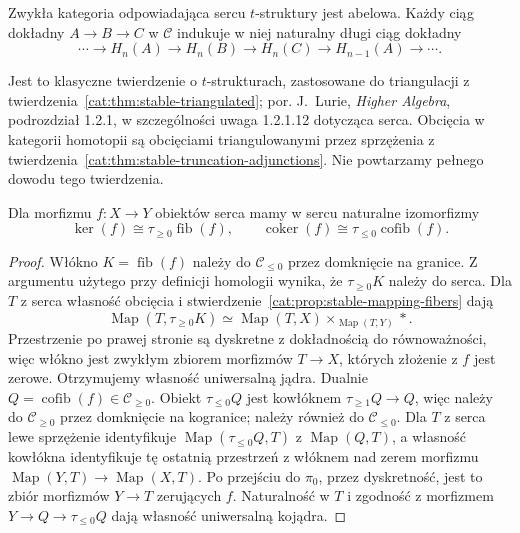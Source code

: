 \begin{twierdzenie}\label{cat:thm:stable-heart-abelian}
Zwykła kategoria odpowiadająca sercu $t$-struktury jest abelowa. Każdy ciąg dokładny $A\to B\to C$ w $\mathcal C$ indukuje w niej naturalny długi ciąg dokładny
\[
 \cdots\longrightarrow H_n(A)\longrightarrow H_n(B)
 \longrightarrow H_n(C)\longrightarrow H_{n-1}(A)
 \longrightarrow\cdots.
\]
\end{twierdzenie}
Jest to klasyczne twierdzenie o $t$-strukturach, zastosowane do triangulacji z twierdzenia~\ref{cat:thm:stable-triangulated}; por. J.~Lurie, \emph{Higher Algebra}, podrozdział 1.2.1, w szczególności uwaga 1.2.1.12 dotycząca serca. Obcięcia w kategorii homotopii są obcięciami triangulowanymi przez sprzężenia z twierdzenia~\ref{cat:thm:stable-truncation-adjunctions}. Nie powtarzamy pełnego dowodu tego twierdzenia.

\begin{stwierdzenie}\label{cat:prop:stable-heart-kernel-cokernel}
Dla morfizmu $f:X\to Y$ obiektów serca mamy w sercu naturalne izomorfizmy
\[
 \ker(f)\cong\tau_{\geq0}\operatorname{fib}(f),\qquad
 \operatorname{coker}(f)\cong\tau_{\leq0}\operatorname{cofib}(f).
\]
\end{stwierdzenie}
\begin{proof}
Włókno $K=\operatorname{fib}(f)$ należy do $\mathcal C_{\leq0}$ przez domknięcie na granice. Z argumentu użytego przy definicji homologii wynika, że $\tau_{\geq0}K$ należy do serca. Dla $T$ z serca własność obcięcia i stwierdzenie~\ref{cat:prop:stable-mapping-fibers} dają
\[
 \operatorname{Map}(T,\tau_{\geq0}K)
 \simeq\operatorname{Map}(T,X)\times_{\operatorname{Map}(T,Y)}*.
\]
Przestrzenie po prawej stronie są dyskretne z dokładnością do równoważności, więc włókno jest zwykłym zbiorem morfizmów $T\to X$, których złożenie z $f$ jest zerowe. Otrzymujemy własność uniwersalną jądra. Dualnie $Q=\operatorname{cofib}(f)\in\mathcal C_{\geq0}$. Obiekt $\tau_{\leq0}Q$ jest kowłóknem $\tau_{\geq1}Q\to Q$, więc należy do $\mathcal C_{\geq0}$ przez domknięcie na kogranice; należy również do $\mathcal C_{\leq0}$. Dla $T$ z serca lewe sprzężenie identyfikuje $\operatorname{Map}(\tau_{\leq0}Q,T)$ z $\operatorname{Map}(Q,T)$, a własność kowłókna identyfikuje tę ostatnią przestrzeń z włóknem nad zerem morfizmu $\operatorname{Map}(Y,T)\to\operatorname{Map}(X,T)$. Po przejściu do $\pi_0$, przez dyskretność, jest to zbiór morfizmów $Y\to T$ zerujących $f$. Naturalność w $T$ i zgodność z morfizmem $Y\to Q\to\tau_{\leq0}Q$ dają własność uniwersalną kojądra.
\end{proof}

